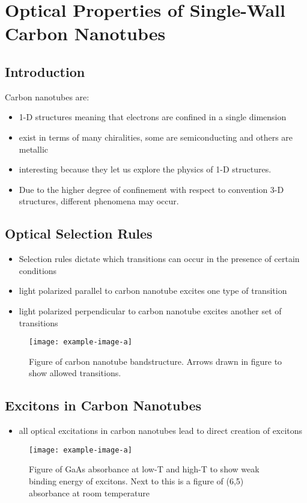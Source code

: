 \chapter{Optical Properties of Single-Wall Carbon Nanotubes}

\section{Introduction}
Carbon nanotubes are:
\begin{itemize}
	\item 1-D structures meaning that electrons are confined in a single dimension
	\item exist in terms of many chiralities, some are semiconducting and others are metallic
	\item interesting because they let us explore the physics of 1-D structures. 
	\item Due to the higher degree of confinement with respect to convention 3-D structures, different phenomena may occur.
\end{itemize}

\section{Optical Selection Rules}
\begin{itemize}
	\item Selection rules dictate which transitions can occur in the presence of certain conditions
	\item light polarized parallel to carbon nanotube excites one type of transition
	\item light polarized perpendicular to carbon nanotube excites another set of transitions
\end{itemize}

\begin{figure}[h]
	\centering
	\texttt{[image: example-image-a]}
	\caption{Figure of carbon nanotube bandstructure. Arrows drawn in figure to show allowed transitions.}
	\label{fig:beam_diamter_measurement}
\end{figure}

\section{Excitons in Carbon Nanotubes}
\begin{itemize}
	\item all optical excitations in carbon nanotubes lead to direct creation of excitons
\end{itemize}

\begin{figure}[h]
	\centering
	\texttt{[image: example-image-a]}
	\caption{Figure of GaAs absorbance at low-T and high-T to show weak binding energy of excitons. Next to this is a figure of  (6,5) absorbance at room temperature}
	\label{fig:gaas_vs_cnt_absorbance}
\end{figure}
